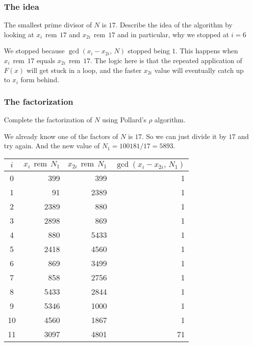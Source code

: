 \documentclass{article}
\newcommand{\rem}{\,\operatorname{rem}\,}
\begin{document}
  \subsubsection{The idea}
  \begin{centerframebox}
    The smallest prime divisor of $N$ is $17$. Describe the idea of the algorithm by looking at
    $x_i \rem 17$ and $x_{2i} \rem 17$ and in particular, why
    we stopped at $i = 6$
  \end{centerframebox}
  We stopped because $\gcd(x_i - x_{2i},\, N)$ stopped being $1$.
  This happens when $x_i \rem 17$ equals $x_{2i} \rem 17$.
  The logic here is that the repeated application of $F(x)$ will get stuck in a loop,
  and the faster $x_{2i}$ value will eventually catch up to $x_i$ form behind.

  \subsubsection{The factorization}
  \begin{centerframebox}
    Complete the factorization of $N$ using Pollard's $\rho$ algorithm.
  \end{centerframebox}
  We already know one of the factors of $N$ is $17$.
  So we can just divide it by $17$ and try again.
  And the new value of $N_1 = 100 181 / 17 = 5893$.

  \begin{center}
    \begin{tabular}{c|rrr}
      $i$ & $x_i \rem N_1$ & $x_{2i} \rem N_1$ & $\gcd(x_i - x_{2i},\, N_1)$ \\\hline
      0 & 399 & 399 & 1 \\
      1 & 91 & 2389 & 1 \\
      2 & 2389 & 880 & 1 \\
      3 & 2898 & 869 & 1 \\
      4 & 880 & 5433 & 1 \\
      5 & 2418 & 4560 & 1 \\
      6 & 869 & 3499 & 1 \\
      7 & 858 & 2756 & 1 \\
      8 & 5433 & 2844 & 1 \\
      9 & 5346 & 1000 & 1 \\
      10 & 4560 & 1867 & 1 \\
      11 & 3097 & 4801 & 71 \\
    \end{tabular}
  \end{center}
\end{document}
